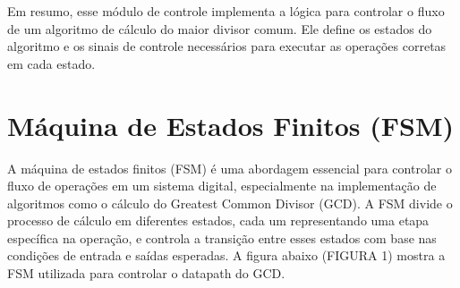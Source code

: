 \documentclass[a4paper,11pt]{article} %
\begin{document}

Em resumo, esse módulo de controle implementa a lógica para controlar o fluxo de um algoritmo de cálculo do maior divisor comum. Ele define os estados do algoritmo e os sinais de controle necessários para executar as operações corretas em cada estado.

\section{Máquina de Estados Finitos (FSM)}
A máquina de estados finitos (FSM) é uma abordagem essencial
para controlar o fluxo de operações em um sistema digital,
especialmente na implementação de algoritmos como o cálculo
do Greatest Common Divisor (GCD). A FSM divide o processo
de cálculo em diferentes estados, cada um representando uma
etapa específica na operação, e controla a transição entre
esses estados com base nas condições de entrada e saídas
esperadas. A figura abaixo (FIGURA 1) mostra a FSM utilizada para controlar
o datapath do GCD.
\end{document}
